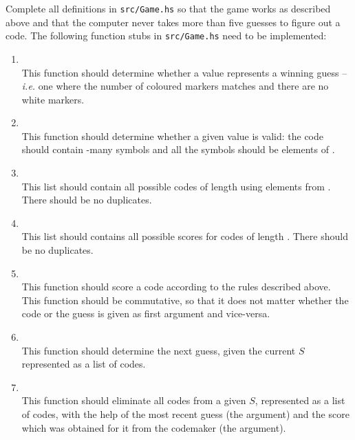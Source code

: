 Complete all definitions in \texttt{\small src/Game.hs} so that the game works as described above and that the computer never takes more than five guesses to figure out a code. The following function stubs in \texttt{\small src/Game.hs}  need to be implemented:

\begin{enumerate}
	\item {}\\
	This function should determine whether a  value represents a winning guess -- \emph{i.e.} one where the number of coloured markers matches  and there are no white markers.
	\item {}\\
	This function should determine whether a given  value is valid: the code should contain -many symbols and all the symbols should be elements of .
	\item {}\\
	This list should contain all possible codes of length  using elements from . There should be no duplicates.
	\item {}\\
	This list should contains all possible scores for codes of length . There should be no duplicates.
	\item {}\\
	This function should score a code according to the rules described above. This function should be commutative, so that it does not matter whether the code or the guess is given as first argument and vice-versa.
	\item {} \\
	This function should determine the next guess, given the current $S$ represented as a list of codes.
	\item {}\\
	This function should eliminate all codes from a given $S$, represented as a list of codes, with the help of the most recent guess (the  argument) and the score which was obtained for it from the codemaker (the  argument).
\end{enumerate}
